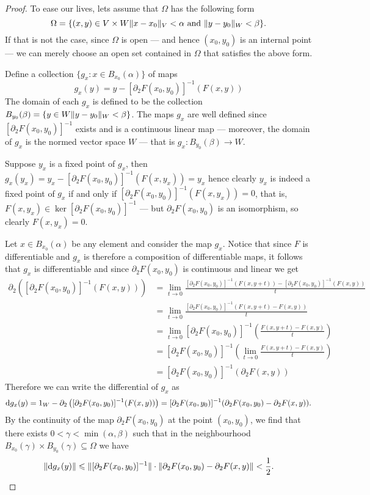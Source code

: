 \begin{proof}
To ease our lives, lets assume that \(\Omega\) has the following form
\[
  \Omega = \{(x, y) \in V \times W \relax \lVert x - x_{0}\rVert_{V} < \alpha
  \text{ and } \lVert y - y_0\rVert_W < \beta\}.
\]
If that is not the case, since \(\Omega\) is open --- and hence \((x_{0}, y_0)\) is
an internal point --- we can merely choose an open set contained in \(\Omega\) that
satisfies the above form.

Define a collection \(\{g_{x} \colon x \in B_{x_0}(\alpha)\}\) of maps
\[
  g_{x}(y) = y - [\partial_2F(x_0, y_0)]^{-1} (F(x, y))
\]
The domain of each \(g_x\) is defined to be the collection \(B_{y_0}(\beta) = \{y
\in W \relax \lVert y - y_0\rVert_W < \beta\}\). The maps \(g_{x}\) are well defined since
\([\partial_2F(x_0, y_0)]^{-1}\) exists and is a continuous linear map --- moreover, the
domain of \(g_x\) is the normed vector space \(W\) --- that is \(g_x: B_{y_0}(\beta) \to
W\).

Suppose \(y_x\) is a fixed point of \(g_x\), then \(g_x(y_x) = y_x -
[\partial_2F(x_0, y_0)]^{-1}(F(x, y_x)) = y_{x}\) hence clearly \(y_x\) is indeed a
fixed point of \(g_x\) if and only if \([\partial_2F(x_0, y_0)]^{-1}(F(x, y_x)) =
0\), that is, \(F(x, y_x) \in \ker [\partial_2F(x_0, y_0)]^{-1}\) --- but \(\partial_2 F(x_0,
y_0)\) is an isomorphism, so clearly \(F(x, y_x) = 0\).

Let \(x \in B_{x_0}(\alpha)\) be any element and consider the map \(g_x\). Notice
that since \(F\) is differentiable and \(g_{x}\) is therefore a composition of
differentiable maps, it follows that \(g_x\) is differentiable and since \(\partial_2
F(x_0, y_0)\) is continuous and linear we get
{\small%
\begin{align*}
  \partial_2 \left( [\partial_2F(x_0, y_0)]^{-1}(F(x, y)) \right)
  &= \lim_{t \to 0} \frac{[\partial_{2}F(x_0, y_0)]^{-1}(F(x, y + t)) - [\partial_2F(x_0,
    y_0)]^{-1}(F(x, y))}{t}
  \\
  &= \lim_{t \to 0} \frac{[\partial_2F(x_0, y_{0})]^{-1}(F(x, y + t) - F(x, y))}{t}
  \\
  &= \lim_{t \to 0} [\partial_2F(x_0, y_0)]^{-1}
    \left( \frac{F(x, y + t) - F(x, y)}{t} \right)
  \\
  &= [\partial_2F(x_0, y_0)]^{-1}
    \left( \lim_{t \to 0} \frac{F(x, y + t) - F(x, y)}{t} \right)
  \\
  &= [\partial_{2}F(x_0, y_0)]^{-1}(\partial_2 F(x, y))
\end{align*}
}%
Therefore we can write the differential of \(g_{x}\) as
\[
  \mathrm{d} g_x(y) = 1_W - \partial_{2}\left([\partial_2F(x_0, y_0)]^{-1}(F(x, y))\right)
  = [\partial_2F(x_0, y_0)]^{-1}(\partial_2F(x_0, y_0) - \partial_2F(x, y)).
\]
By the continuity of the map \(\partial_2F(x_0, y_0)\) at the point \((x_0, y_0)\),
we find that there exists \(0 < \gamma < \min(\alpha, \beta)\) such that in the neighbourhood
\(B_{x_0}(\gamma) \times B_{y_0}(\gamma) \subseteq \Omega\) we have
\[
  \lVert\mathrm{d} g_x(y)\rVert \leqslant \lVert[\partial_{2}F(x_0, y_0)]^{-1}\rVert \cdot \lVert\partial_2F(x_0, y_0) -
    \partial_2F(x, y)\rVert < \frac{1}{2}.
\]


\end{proof}
